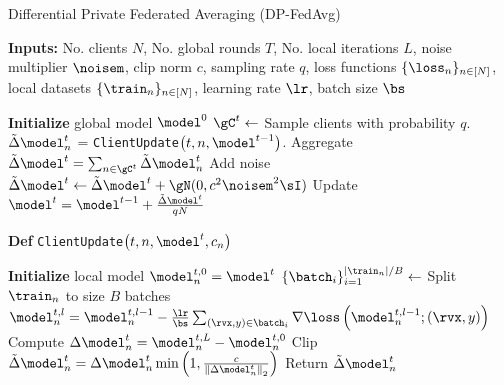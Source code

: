 

\begin{algorithm}[H]
\caption{Differential Private Federated Averaging (DP-FedAvg)~\citep{mcmahan2017learning}}
\textbf{Inputs:} No. clients $N$, No. global rounds $T$, No. local iterations $L$, noise multiplier $\noisem$, clip norm $c$, sampling rate $q$, loss functions $\{\loss_n\}_{n\in [N]}$, local datasets $\{\train_n\}_{n\in [N]}$, learning rate $\lr$, batch size $\bs$ 
\label{alg:dpfl}
\begin{algorithmic}[1]
\State \textbf{Initialize} global model $\model^0$
\State $\gC^t \gets$ Sample clients with probability $q$.
\State $\tilde{\Delta}\model_n^t$ =  
\texttt{ClientUpdate}$\left(t, n,\model^{t-1}\right)$.
\EndFor
\State Aggregate $\tilde{\Delta}\model^t = \sum_{n\in \gC^t} \tilde{\Delta}\model_n^t$
\State Add noise $\tilde{\Delta}\model^t \gets \tilde{\Delta}\model^t + \gN(0,c^2\noisem^2\sI)$
\State Update $\model^{t} = \model^{t-1} + \frac{\tilde{\Delta}\model^t}{qN}$
\EndFor
\Statex
\end{algorithmic}
\textbf{Def} \texttt{ClientUpdate}$\left(t, n,\model^{t}, c_n\right)$
\begin{algorithmic}[1]
\State \textbf{Initialize} local model $\model_n^{t,0}=\model^t$
\State $\{\batch_i\}_{i=1}^{|\train_n|/B} \gets$ Split $\train_n$ to size $B$ batches
\State $\model_n^{t,l} = \model_n^{t,l-1}-\frac{\lr}{\bs}\sum_{(\rvx,y)\in \batch_i} \nabla\loss\left(\model_n^{t,l-1};(\rvx,y)\right)$
\EndFor
\EndFor
\State Compute $\Delta\model_n^t = \model_n^{t,L} - \model_n^{t,0}$
\State Clip $\tilde{\Delta}\model_n^{t} = \Delta\model_n^t\min\left(1,\frac{c}{\left\|\Delta\model_n^{t}\right\|_2}\right)$  
\State Return $\tilde{\Delta}\model_n^{t}$ 
\end{algorithmic}
\end{algorithm}
